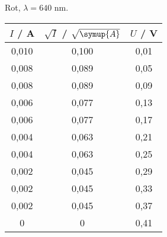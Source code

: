 \begin{subtable}{0.4\textwidth}
\centering
\caption{Rot, $\lambda = 640 $ nm.} 
        \begin{tabular}{c c c}
            \toprule
            { $I$ / A} & {$\sqrt{I}$ / $\sqrt{\symup{A}}$} & {$U$ / V} \\
            \midrule
               0,010 & 0,100 & 0,01 \\
               0,008 & 0,089 & 0,05 \\
               0,008 & 0,089 & 0,09 \\
               0,006 & 0,077 & 0,13 \\
               0,006 & 0,077 & 0,17 \\
               0,004 & 0,063 & 0,21 \\
               0,004 & 0,063 & 0,25 \\
               0,002 & 0,045 & 0,29 \\
               0,002 & 0,045 & 0,33 \\
               0,002 & 0,045 & 0,37 \\
               0 & 0& 0,41 \\
         \bottomrule
        \end{tabular}
        
        \end{subtable}